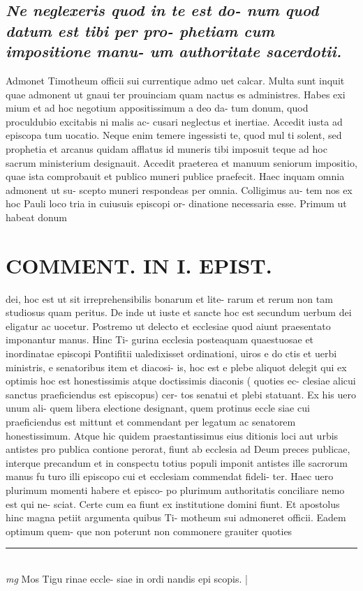 \documentclass{article}
\begin{document}
\begin{pages}
\subsection*{\textit{Ne neglexeris quod in te est do- num quod datum est tibi per pro- phetiam cum impositione manu- um authoritate sacerdotii. }}\pstart Admonet Timotheum officii sui currentique admo uet calcar. Multa sunt inquit quae admonent ut gnaui ter prouinciam quam nactus es administres. Habes exi mium et ad hoc negotium appositissimum a deo da- tum donum, quod proculdubio excitabis ni malis ac- cusari neglectus et inertiae. Accedit iusta ad episcopa tum uocatio. Neque enim temere ingessisti te, quod mul ti solent, sed prophetia et arcanus quidam afflatus id muneris tibi imposuit teque ad hoc sacrum ministerium designauit. Accedit praeterea et manuum seniorum impositio, quae ista comprobauit et publico muneri publice praefecit. Haec inquam omnia admonent ut su- scepto muneri respondeas per omnia. Colligimus au- tem nos ex hoc Pauli loco tria in cuiusuis episcopi or- dinatione necessaria esse. Primum ut habeat donum  \pend
\section*{COMMENT. IN I. EPIST. }\pstart dei, hoc est ut sit irreprehensibilis bonarum et lite- rarum et rerum non tam studiosus quam peritus. De inde ut iuste et sancte hoc est secundum uerbum dei eligatur ac uocetur. Postremo ut delecto et ecclesiae quod aiunt praesentato imponantur manus. Hinc Ti- gurina ecclesia posteaquam quaestuosae et inordinatae episcopi Pontifitii ualedixisset ordinationi, uiros e do ctis et uerbi ministris, e senatoribus item et diacosi- is, hoc est e plebe aliquot delegit qui ex optimis hoc est honestissimis atque doctissimis diaconis ( quoties ec- clesiae alicui sanctus praeficiendus est episcopus) cer- tos senatui et plebi statuant. Ex his uero unum ali- quem libera electione designant, quem protinus eccle siae cui praeficiendus est mittunt et commendant per legatum ac senatorem honestissimum. Atque hic quidem praestantissimus eius ditionis loci aut urbis antistes pro publica contione perorat, fiunt ab ecclesia ad Deum preces publicae, interque precandum et in conspectu totius populi imponit antistes ille sacrorum manus fu turo illi episcopo cui et ecclesiam commendat fideli- ter. Haec uero plurimum momenti habere et episco- po plurimum authoritatis conciliare nemo est qui ne- sciat. Certe cum ea fiunt ex institutione domini fiunt. Et apostolus hinc magna petiit argumenta quibus Ti- motheum sui admoneret officii. Eadem optimum quem- que non poterunt non commonere grauiter quoties  \pend
\vspace{0.5cm}\noindent
\vspace{0.2cm}\rule{1cm}{0.2pt}\\ 
\hspace{0.2cm}\textit{mg}
\footnotesize Mos Tigu rinae eccle- siae in ordi nandis epi scopis. 
\normalsize| 

\end{pages}
\end{document}
